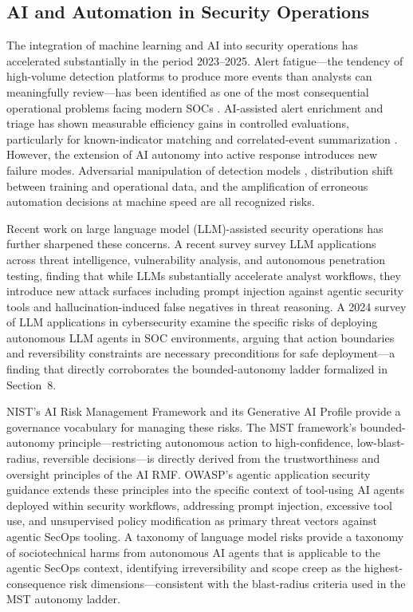 \documentclass[unnumsec,webpdf,contemporary,large]{oup-authoring-template}
\theoremstyle{thmstyleone}
\theoremstyle{thmstyletwo}
\theoremstyle{thmstylethree}
\begin{document}
\subsection{AI and Automation in Security Operations}

The integration of machine learning and AI into security operations has accelerated
substantially in the period 2023--2025. Alert fatigue---the tendency of high-volume
detection platforms to produce more events than analysts can meaningfully
review---has been identified as one of the most consequential operational problems
facing modern SOCs \cite{verizon2025}. AI-assisted alert enrichment and triage has
shown measurable efficiency gains in controlled evaluations, particularly for
known-indicator matching and correlated-event summarization \cite{husari2017}.
However, the extension of AI autonomy into active response introduces new failure
modes. Adversarial manipulation of detection models \cite{papernot2016},
distribution shift between training and operational data, and the amplification of
erroneous automation decisions at machine speed are all recognized risks.

Recent work on large language model (LLM)-assisted security operations has further
sharpened these concerns. A recent survey \cite{ferrag2025} survey LLM applications
across threat intelligence, vulnerability analysis, and autonomous penetration
testing, finding that while LLMs substantially accelerate analyst workflows, they
introduce new attack surfaces including prompt injection against agentic security
tools and hallucination-induced false negatives in threat reasoning. A 2024 survey of LLM applications in cybersecurity \cite{motlagh2024} examine the specific risks of deploying autonomous LLM agents in
SOC environments, arguing that action boundaries and reversibility constraints are
necessary preconditions for safe deployment---a finding that directly corroborates
the bounded-autonomy ladder formalized in Section~8.

NIST's AI Risk Management Framework \cite{tabassi2023} and its Generative AI Profile
\cite{autio2024} provide a governance vocabulary for managing these risks. The MST
framework's bounded-autonomy principle---restricting autonomous action to
high-confidence, low-blast-radius, reversible decisions---is directly derived from the
trustworthiness and oversight principles of the AI RMF. OWASP's agentic application
security guidance \cite{owasp2025} extends these principles into the specific context of
tool-using AI agents deployed within security workflows, addressing prompt injection,
excessive tool use, and unsupervised policy modification as primary threat vectors against
agentic SecOps tooling. A taxonomy of language model risks \cite{weidinger2022} provide a taxonomy of
sociotechnical harms from autonomous AI agents that is applicable to the agentic SecOps
context, identifying irreversibility and scope creep as the highest-consequence risk
dimensions---consistent with the blast-radius criteria used in the MST autonomy ladder.
\end{document}
